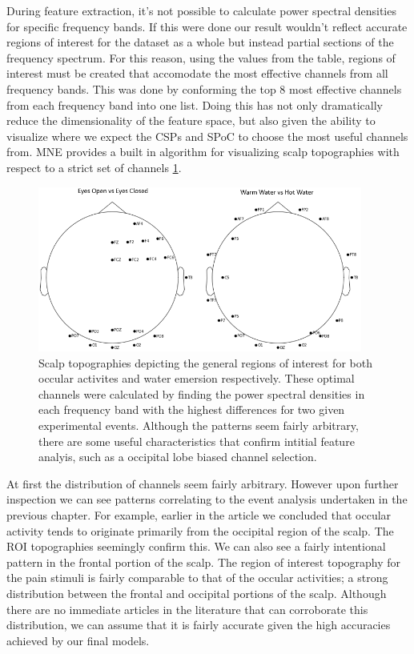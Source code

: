 \documentclass[11pt]{article}
\begin{document}
During feature extraction, it's not possible to calculate power spectral densities for specific frequency bands. If this were done our result wouldn't reflect accurate regions of interest for the dataset as a whole but instead partial sections of the frequency spectrum. For this reason, using the values from the table, regions of interest must be created that accomodate the most effective channels from all frequency bands. This was done by conforming the top 8 most effective channels from each frequency band into one list. Doing this has not only dramatically reduce the dimensionality of the feature space, but also given the ability to visualize where we expect the CSPs and SPoC to choose the most useful channels from. MNE provides a built in algorithm for visualizing scalp topographies with respect to a strict set of channels \ref{fig:ROI}.

\begin{figure}[tb]
\centering
\includegraphics[width=0.95\textwidth]{ROI.png}
\caption{\label{fig:ROI}
Scalp topographies depicting the general regions of interest for both occular activites and water emersion respectively. These optimal channels were calculated by finding the power spectral densities in each frequency band with the highest differences for two given experimental events. Although the patterns seem fairly arbitrary, there are some useful characteristics that confirm intitial feature analyis, such as a occipital lobe biased channel selection.}
\end{figure} 

At first the distribution of channels seem fairly arbitrary. However upon further inspection we can see patterns correlating to the event analysis undertaken in the previous chapter. For example, earlier in the article we concluded that occular activity tends to originate primarily from the occipital region of the scalp. The ROI topographies seemingly confirm this. We can also see a fairly intentional pattern in the frontal portion of the scalp. The region of interest topography for the pain stimuli is fairly comparable to that of the occular activities; a strong distribution between the frontal and occipital portions of the scalp. Although there are no immediate articles in the literature that can corroborate this distribution, we can assume that it is fairly accurate given the high accuracies achieved by our final models.
\end{document}
